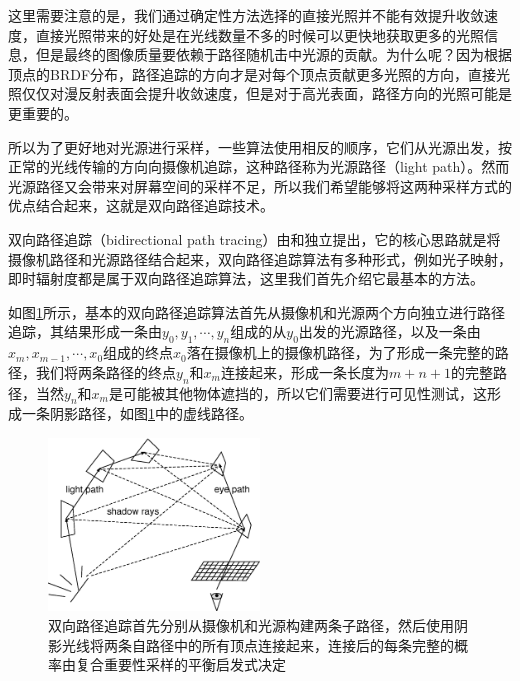 这里需要注意的是，我们通过确定性方法选择的直接光照并不能有效提升收敛速度，直接光照带来的好处是在光线数量不多的时候可以更快地获取更多的光照信息，但是最终的图像质量要依赖于路径随机击中光源的贡献。为什么呢？因为根据顶点的BRDF分布，路径追踪的方向才是对每个顶点贡献更多光照的方向，直接光照仅仅对漫反射表面会提升收敛速度，但是对于高光表面，路径方向的光照可能是更重要的。

所以为了更好地对光源进行采样，一些算法使用相反的顺序，它们从光源出发，按正常的光线传输的方向向摄像机追踪，这种路径称为光源路径（light path）。然而光源路径又会带来对屏幕空间的采样不足，所以我们希望能够将这两种采样方式的优点结合起来，这就是双向路径追踪技术。

双向路径追踪（bidirectional path tracing）由\cite{a:Bi-directionalpathtracing}和\cite{a:BidirectionalEstimatorsforLightTransport}独立提出，它的核心思路就是将摄像机路径和光源路径结合起来，双向路径追踪算法有多种形式，例如光子映射，即时辐射度都是属于双向路径追踪算法，这里我们首先介绍它最基本的方法。

如图\ref{f:pt-bidirectional}所示，基本的双向路径追踪算法首先从摄像机和光源两个方向独立进行路径追踪，其结果形成一条由$y_0,y_1,\cdots,y_n$组成的从$y_0$出发的光源路径，以及一条由$x_m,x_{m-1},\cdots,x_0$组成的终点$x_0$落在摄像机上的摄像机路径，为了形成一条完整的路径，我们将两条路径的终点$y_n$和$x_m$连接起来，形成一条长度为$m+n+1$的完整路径，当然$y_n$和$x_m$是可能被其他物体遮挡的，所以它们需要进行可见性测试，这形成一条阴影路径，如图\ref{f:pt-bidirectional}中的虚线路径。

\begin{figure}
	\sidecaption
	\includegraphics[width=0.5\textwidth]{figures/pt/bidirectional}
	\caption{双向路径追踪首先分别从摄像机和光源构建两条子路径，然后使用阴影光线将两条自路径中的所有顶点连接起来，连接后的每条完整的概率由复合重要性采样的平衡启发式决定}
	\label{f:pt-bidirectional}
\end{figure}

